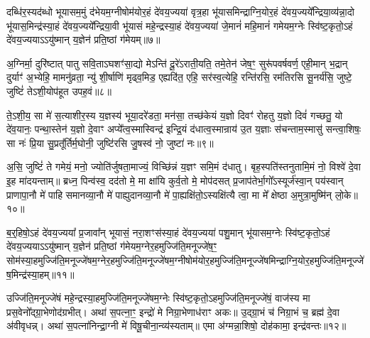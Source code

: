 दब्धि॑र॒स्यद॑ब्धो भूयासम॒मुं द॑भेयम॒ग्नीषोम॑योर॒हं दे॑वय॒ज्यया॑ वृत्र॒हा भू॑यासमिन्द्राग्नि॒योर॒हं दे॑वय॒ज्यये᳚न्द्रिया॒व्य॑न्ना॒दो भू॑यास॒मिन्द्र॑स्या॒हं दे॑वय॒ज्यये᳚न्द्रिया॒वी भू॑यासं महे॒न्द्रस्या॒हं दे॑वय॒ज्यया॑ जे॒मानं॑ महि॒मानं॑ गमेयम॒ग्नेः स्वि॑ष्ट॒कृतो॒\-ऽहं दे॑वय॒ज्यया\-ऽ\-ऽयु॑ष्मान् य॒ज्ञेन॑ प्रति॒ष्ठां ग॑मेयम्॥७॥

{\anuvakamend[{रिष्या᳚त् सपत्न॒क्षय॑ण्यन्ना॒दो भू॑यास॒ꣳ॒ षट्त्रिꣳ॑शच्च॥२॥}]}

अ॒ग्निर्मा॒ दुरि॑ष्टात् पातु सवि॒ता\-ऽघशꣳ॑सा॒द्यो मे\-ऽन्ति॑ दू॒रे॑\-ऽराती॒यति॒ तमे॒तेन॑ जेष॒ꣳ॒ सुरू॑पवर्\mbox{}षवर्ण॒ एही॒मान् भ॒द्रान् दुर्याꣳ॑ अ॒भ्येहि॒ मामनु॑व्रता॒ न्यु॑ शी॒र्\mbox{}षाणि॑ मृढ्व॒मिड॒ एह्यदि॑त॒ एहि॒ सर॑स्व॒त्येहि॒ रन्ति॑रसि॒ रम॑तिरसि सू॒नर्य॑सि॒ जुष्टे॒ जुष्टिं॑ ते\-ऽशी॒योप॑हूत उपह॒वं॥८॥

ते॒\-ऽशी॒य॒ सा मे॑ स॒त्याशीर॒स्य य॒ज्ञस्य॑ भूया॒दरे॑डता॒ मन॑सा॒ तच्छ॑केयं य॒ज्ञो दिवꣳ॑ रोहतु य॒ज्ञो दिवं॑ गच्छतु॒ यो दे॑व॒यानः॒ पन्था॒स्तेन॑ य॒ज्ञो दे॒वाꣳ अप्ये᳚त्व॒स्मास्विन्द्र॑ इन्द्रि॒यं द॑धात्व॒स्मान्राय॑ उ॒त य॒ज्ञाः स॑चन्ताम॒स्मासु॑ सन्त्वा॒शिषः॒ सा नः॑ प्रि॒या सु॒प्रतू᳚र्तिर्म॒घोनी॒ जुष्टि॑रसि जु॒षस्व॑ नो॒ जुष्टा॑ नः॥९॥

अ॒सि॒ जुष्टिं॑ ते गमेयं॒ मनो॒ ज्योति॑र्जुषता॒माज्यं॒ विच्छि॑न्नं य॒ज्ञꣳ समि॒मं द॑धातु। बृह॒स्पति॑स्तनुतामि॒मं नो॒ विश्वे॑ दे॒वा इ॒ह मा॑दयन्ताम्॥ ब्रध्न॒ पिन्व॑स्व॒ दद॑तो मे॒ मा क्षा॑यि कुर्व॒तो मे॒ मोप॑दसत् प्र॒जाप॑तेर्भा॒गो᳚\-ऽस्यूर्ज॑स्वा॒न् पय॑स्वान् प्राणापा॒नौ मे॑ पाहि समानव्या॒नौ मे॑ पाह्युदानव्या॒नौ मे॑ पा॒ह्यक्षि॑तो॒\-ऽस्यक्षि॑त्यै त्वा॒ मा मे᳚ क्षेष्ठा अ॒मुत्रा॒मुष्मि॑न् लो॒के॥१०॥

{\anuvakamend[{उ॒प॒ह॒वं जुष्टा॑ नस्त्वा॒ षट् च॑॥३॥}]}

ब॒र्॒\mbox{}हिषो॒\-ऽहं दे॑वय॒ज्यया᳚ प्र॒जावा᳚न् भूयासं॒ नरा॒शꣳस॑स्या॒हं दे॑वय॒ज्यया॑ पशु॒मान् भू॑यासम॒ग्नेः स्वि॑ष्ट॒कृतो॒\-ऽहं दे॑वय॒ज्यया\-ऽ\-ऽयु॑ष्मान् य॒ज्ञेन॑ प्रति॒ष्ठां ग॑मेयम॒ग्नेर॒हमुज्जि॑ति॒मनूज्जे॑ष॒ꣳ॒ सोम॑स्या॒हमुज्जि॑ति॒मनूज्जे॑षम॒ग्नेर॒हमुज्जि॑ति॒मनूज्जे॑षम॒ग्नीषोम॑योर॒हमुज्जि॑ति॒मनूज्जे॑षमिन्द्राग्नि॒योर॒हमुज्जि॑ति॒\-मनूज्जे॑ष॒मिन्द्र॑स्या॒हम्॥११॥

उज्जि॑ति॒मनूज्जे॑षं महे॒न्द्रस्या॒हमुज्जि॑ति॒मनूज्जे॑षम॒ग्नेः स्वि॑ष्ट॒कृतो॒\-ऽहमुज्जि॑ति॒मनूज्जे॑षं॒ वाज॑स्य मा प्रस॒वेनो᳚द्ग्रा॒भेणोद॑ग्रभीत्। अथा॑ स॒पत्ना॒ꣳ॒ इन्द्रो॑ मे निग्रा॒भेणाध॑राꣳ अकः॥ उ॒द्ग्रा॒भं च॑ निग्रा॒भं च॒ ब्रह्म॑ दे॒वा अ॑वीवृधन्न्। अथा॑ स॒पत्ना॑निन्द्रा॒ग्नी मे॑ विषू॒चीना॒न्व्य॑स्यताम्॥ एमा अ॑ग्मन्ना॒शिषो॒ दोह॑कामा॒ इन्द्र॑वन्तः॥१२॥

